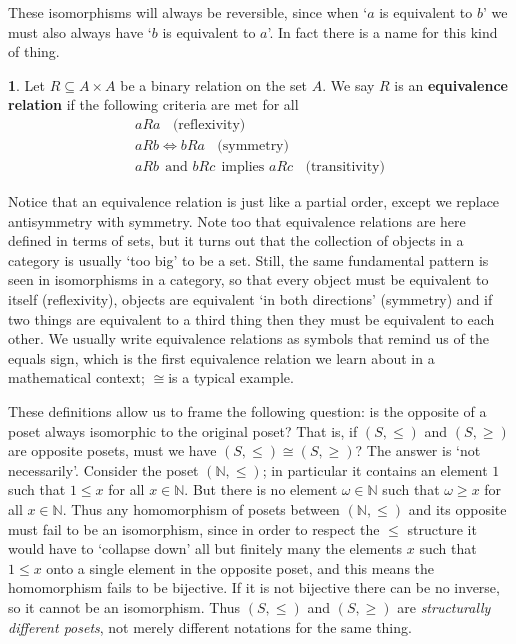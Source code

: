\documentclass[oneside,english]{amsbook}
\numberwithin{section}{chapter}
\theoremstyle{plain}
\theoremstyle{definition}
\newtheorem{defn}[thm]{\protect\definitionname}
\providecommand{\definitionname}{Definition}
\begin{document}
These isomorphisms will always be reversible, since when `$a$ is equivalent to $b$' we must also always have `$b$ is equivalent to $a$'. In fact there is a name for this kind of thing. 

\begin{defn} Let $R\subseteq A\times A$ be a binary relation on the set $A$. We say $R$ is an \textbf{equivalence relation} if the following criteria are met for all  
	\begin{multline*} 
		aRa\ \ \ \ \text{(reflexivity)}\\ 
		aRb\Leftrightarrow bRa\ \ \ \ \text{(symmetry)}\\ 
		aRb\ \ \text{and \ \ }bRc\ \ \text{implies \ \ }aRc\ \ \ \ \text{(transitivity)} 
	\end{multline*}
\end{defn} 

Notice that an equivalence relation is just like a partial order, except we replace antisymmetry with symmetry. Note too that equivalence relations are here defined in terms of sets, but it turns out that the collection of objects in a category is usually `too big' to be a set. Still, the same fundamental pattern is seen in isomorphisms in a category, so that every object must be equivalent to itself (reflexivity), objects are equivalent `in both directions' (symmetry) and if two things are equivalent to a third thing then they must be equivalent to each other. We usually write equivalence relations as symbols that remind us of the equals sign, which is the first equivalence relation we learn about in a mathematical context; $\cong$is a typical example.

These definitions allow us to frame the following question: is the opposite of a poset always isomorphic to the original poset? That is, if $(S,\le)$ and $(S,\ge)$ are opposite posets, must we have $(S,\le)\cong(S,\ge)$? The answer is `not necessarily'. Consider the poset $(\mathbb{N},\le)$; in particular it contains an element $1$ such that $1\le x$ for all $x\in\mathbb{N}$. But there is no element $\omega\in\mathbb{N}$ such that $\omega\ge x$ for all $x\in\mathbb{N}$. Thus any homomorphism of posets between $(\mathbb{N},\le)$ and its opposite must fail to be an isomorphism, since in order to respect the $\le$ structure it would have to `collapse down' all but finitely many the elements $x$ such that $1\le x$ onto a single element in the opposite poset, and this means the homomorphism fails to be bijective. If it is not bijective there can be no inverse, so it cannot be an isomorphism. Thus $(S,\le)$ and $(S,\ge)$ are \emph{structurally different posets}, not merely different notations for the same thing. 
\end{document}
